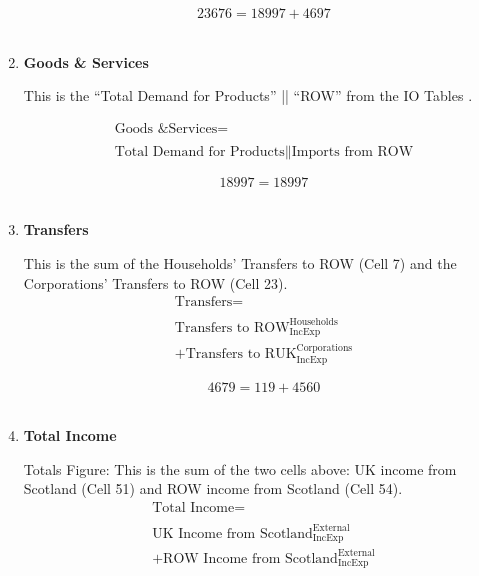 \begin{enumerate}
\begin{equation} \nonumber
23676 = 18997+4697
\end{equation}\\


\item \textbf {Goods \& Services}

This is the ``Total Demand for Products'' || ``ROW'' from the IO Tables \cite{ScotGov2013a}.

\begin{equation}
\begin{split}
\text{Goods \& Services} =  \\ \\
\text{Total Demand for Products}\|\text{Imports from ROW}
\end{split} \label{eq:2.5.59}
\end{equation}

\begin{equation} \nonumber
18997 = 18997
\end{equation}\\


\item \textbf {Transfers}

This is the sum of the Households' Transfers to ROW (Cell 7) and the Corporations' Transfers to ROW (Cell 23).\\

\begin{equation}
\begin{split}
\text{Transfers} =  \\ \\
\text{Transfers to ROW}^\text{Households}_\text{IncExp}\\
+\text{Transfers to RUK}^\text{Corporations}_\text{IncExp}
\end{split} \label{eq:2.5.60}
\end{equation}

\begin{equation} \nonumber
4679 = 119+4560
\end{equation}\\


\item \textbf {Total Income}

Totals Figure: This is the sum of the two cells above: UK income from Scotland (Cell 51) and ROW income from Scotland (Cell 54).\\

\begin{equation}
\begin{split}
\text{Total Income} =  \\ \\
\text{UK Income from Scotland}^\text{External}_\text{IncExp}\\
+\text{ROW Income from Scotland}^\text{External}_\text{IncExp}
\end{split} \label{eq:2.5.61}
\end{equation}


\end{enumerate}
